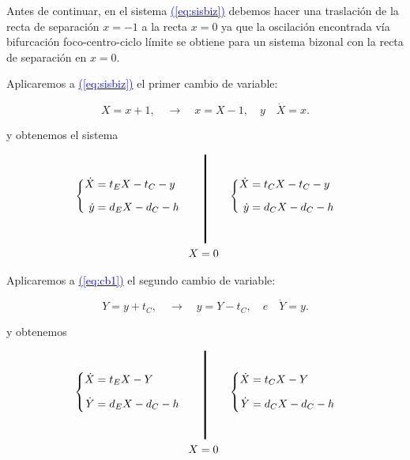 \documentclass[12pt,a4paper]{report} %
\newcommand{\eref}[1]{\hyperref[#1]{\textcolor{blue}{(\ref*{#1})}}}
\begin{document}
	 \vspace{0.5cm} Antes de continuar, en el sistema \eref{eq:sisbiz} debemos hacer una traslación de la recta de separación $x=-1$  a la recta $x=0$ ya que la oscilación encontrada vía bifurcación foco-centro-ciclo límite se obtiene para un sistema bizonal con la recta de separación en $x=0$.
	
	\newpage
	
	\vspace{0.5cm}\noindent Aplicaremos a \eref{eq:sisbiz} el primer cambio de variable:
	
	\begin{equation}
		\label{eq:cambioo1}
		X=x+1, \quad \longrightarrow \quad x=X-1, \quad \textit{y} \quad \dot{X}=x.
	\end{equation}\smallskip

\noindent y obtenemos el sistema
	
	\begin{equation}
		\label{eq:cb1}
		\begin{gathered}
			\left\{
			\begin{aligned}
				\dot{X}&=t_EX-t_C-y
				\\[2mm]
				\dot{y}&=d_EX-d_C-h
			\end{aligned}
			\right. \qquad 
			\rule[-40pt]{1.5pt}{80pt} \qquad 
			\left\{
			\begin{aligned}
				\dot{X}&=t_CX-t_C-y
				\\[2mm]
				\dot{y}&=d_CX-d_C-h
			\end{aligned}
			\right. \\  \!\! X=0
		\end{gathered}
	\end{equation}\smallskip
	
	\vspace{0.5cm}\noindent Aplicaremos a \eref{eq:cb1} el segundo cambio de variable:
	
	\begin{equation}
		\label{eq:cambioo2}
		Y=y+t_C, \quad \longrightarrow \quad y=Y-t_C, \quad \textit{e} \quad \dot{Y}=y.
	\end{equation}\smallskip

\noindent y obtenemos
	
	\begin{equation}
		\label{eq:cb2}
		\begin{gathered}
			\left\{
			\begin{aligned}
				\dot{X}&=t_EX-Y
				\\[2mm]
				\dot{Y}&=d_EX-d_C-h
			\end{aligned}
			\right. \qquad 
			\rule[-40pt]{1.5pt}{80pt} \qquad 
			\left\{
			\begin{aligned}
				\dot{X}&=t_CX-Y
				\\[2mm]
				\dot{Y}&=d_CX-d_C-h
			\end{aligned}
			\right. \\  \!\! X=0
		\end{gathered}
	\end{equation}\smallskip
	
\end{document}
